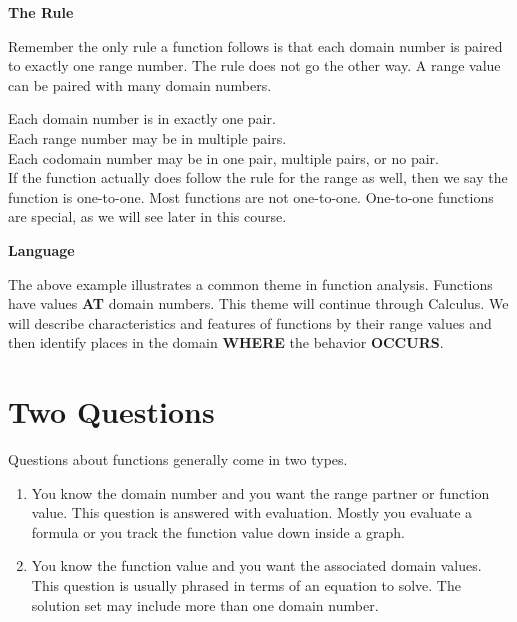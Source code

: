 \documentclass{ximera}
\begin{document}
\begin{remark}  \textbf{\textcolor{blue!75!black}{The Rule}} 

Remember the only rule a function follows is that each domain number is paired to exactly one range number.  The rule does not go the other way.  A range value can be paired with many domain numbers.

Each domain number is in exactly one pair. \\
Each range number may be in multiple pairs. \\
Each codomain number may be in one pair, multiple pairs, or no pair. \\


If the function actually does follow the rule for the range as well, then we say the function is one-to-one. Most functions are not one-to-one.  One-to-one functions are special, as we will see later in this course.


\end{remark}




\begin{remark}  \textbf{\textcolor{blue!75!black}{Language}} 

The above example illustrates a common theme in function analysis.  Functions have values \textbf{\textcolor{purple!85!blue}{AT}} domain numbers.  This theme will continue through Calculus.  We will describe characteristics and features of functions by their range values and then identify places in the domain \textbf{\textcolor{purple!85!blue}{WHERE}} the behavior \textbf{\textcolor{purple!85!blue}{OCCURS}}. 


\end{remark}





\section{Two Questions}

Questions about functions generally come in two types.
\begin{enumerate}
\item You know the domain number and you want the range partner or function value.  This question is answered with evaluation. Mostly you evaluate a formula or you track the function value down inside a graph.

\item You know the function value and you want the associated domain values.  This question is usually phrased in terms of an equation to solve.  The solution set may include more than one domain number.
\end{enumerate}
\end{document}
